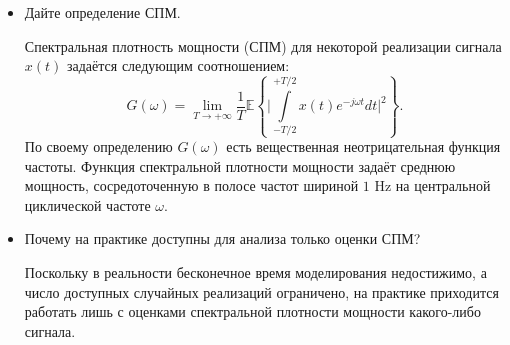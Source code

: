 \newpage
\section{}

\begin{itemize}
	\item Дайте определение СПМ.
	
	Спектральная плотность мощности (СПМ) для некоторой реализации сигнала $x(t)$ задаётся следующим соотношением:
	\begin{equation*}
	G(\omega) = \lim_{T \to +\infty} \dfrac{1}{T}\mathbb{E}\left\{\Bigg|\int \limits_{-T/2}^{+T/2}x(t)e^{-j\omega t}dt\Bigg|^2 \right\}.
	\end{equation*}
	По своему определению $G(\omega)$ есть вещественная неотрицательная функция частоты.
	Функция спектральной плотности мощности задаёт среднюю мощность, сосредоточенную в полосе частот шириной $1$ Hz на центральной циклической частоте $\omega$. 
	
	
	\item Почему на практике доступны для анализа только оценки СПМ?
	
	Поскольку в реальности бесконечное время моделирования недостижимо, а число доступных случайных реализаций ограничено, на практике приходится работать лишь с оценками спектральной плотности мощности какого-либо сигнала.
\end{itemize}
